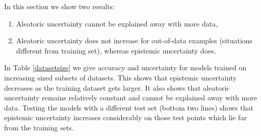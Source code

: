 \documentclass{article}
\begin{document}
In this section we show two results:
\begin{enumerate}[topsep=0pt,itemsep=1ex,partopsep=1ex,parsep=1ex]
\item Aleatoric uncertainty cannot be explained away with more data,
\item Aleatoric uncertainty does not increase for out-of-data examples (situations different from training set), whereas epistemic uncertainty does. \end{enumerate}

In Table \ref{datasetsize} we give accuracy and uncertainty for models trained on increasing sized subsets of datasets. This shows that epistemic uncertainty decreases as the training dataset gets larger. It also shows that aleatoric uncertainty remains relatively constant and cannot be explained away with more data.
Testing the models with a different test set (bottom two lines) shows that epistemic uncertainty increases considerably on those test points which lie far from the training sets.
\end{document}
